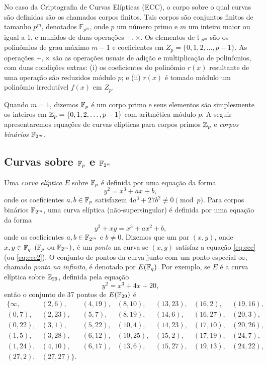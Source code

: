 \documentclass{SBCbookchapter}
\begin{document}
No caso da Criptografia de Curvas Elípticas (ECC), o corpo sobre o qual curvas são definidas são os chamados corpos finitos. Tais corpos são conjuntos finitos de tamanho $p^m$, denotados $\mathbb{F}_{p^m}$, onde $p$ um número primo e $m$ um inteiro maior ou igual a 1, e munidos de duas operações $+, \times$. Os elementos de $\mathbb{F}_{p^m}$ são os polinômios de grau máximo $m-1$ e coeficientes em $Z_p=\{0,1,2,\ldots,p-1\}$. 
As operações $+, \times$ são as operações usuais de adição e multiplicação de polinômios, com duas condições extras: (i) os coeficientes do polinômio $r(x)$ resultante de uma operação são reduzidos módulo $p$; e (ii) $r(x)$ é tomado módulo um polinômio irredutível $f(x)$ em $Z_p$.

Quando $m=1$, dizemos $\mbox{${\mathbb F}$}_p$ é um corpo primo e seus elementos são simplesmente os inteiros em $\mbox{${\mathbb Z}$}_p=\{0,1,2,\ldots,p-1\}$ com aritmética módulo $p$. A seguir  apresentaremos equações de curvas elípticas  para corpos primos $\mbox{${\mathbb Z}$}_p$ e \emph{corpos binários} $\mbox{${\mathbb F}$}_{2^m}$.
%
\subsection*{Curvas sobre $\mbox{${\mathbb F}$}_p$ e $\mbox{${\mathbb F}$}_{2^m}$}
Uma \emph{curva elíptica} $E$ sobre $\mbox{${\mathbb F}$}_p$ é definida por uma equação da forma
\begin{equation}
\label{eq:cce}
y^2 = x^3 + ax + b,
\end{equation}
\noindent onde os coeficientes $a,b  \in \mbox{${\mathbb F}$}_p$ satisfazem $4a^3 + 27b^2
\not\equiv 0 \pmod p$. Para corpos binários $\mbox{${\mathbb F}$}_{2^m}$, uma
curva elíptica (não-supersingular) é definida por uma equação da forma
\begin{equation}
\label{eq:cce2}
y^2 + xy = x^3 + ax^2 + b,
\end{equation}
\noindent onde os  coeficientes $a,b \in \mbox{${\mathbb F}$}_{2^m}$ e  $b\neq 0$.  Dizemos
 que um  par $(x,y)$, onde $x,y \in \mbox{${\mathbb F}$}_q$ $(\mbox{${\mathbb F}$}_p$ ou $\mbox{${\mathbb F}$}_{2^m})$,  é um \emph{
 ponto}  na  curva se  $(x,y)$  satisfaz  a  equação \ref{eq:cce}  (ou
 \ref{eq:cce2}).  O conjunto  de pontos  da curva  junto com  um ponto
 especial {$\infty$}, chamado \emph{ ponto no infinito}, é denotado por
 $E(\mbox{${\mathbb F}$}_q)$.   Por  exemplo,  se $E$  é  a  curva
 elíptica sobre $\mbox{${\mathbb Z}$}_{29}$, definida pela equação
\begin{equation}
\label{eq:cce-exemplo-primo}
y^2 = x^3 + 4x + 20,
\end{equation}
\noindent então o conjunto de 37 pontos de $E(\mbox{${\mathbb F}$}_{29})$ é
\[
\begin{array}{lllllll}
\{{\infty}, & (2,6), & (4,19), & (8,10), & (13,23), & (16,2), & (19,16),  \\
(0,7), & (2,23), & (5,7), & (8,19), & (14,6), & (16,27), & (20,3),  \\
(0,22), & (3,1), & (5,22), & (10,4), & (14,23), & (17,10), & (20,26),  \\
(1,5), & (3,28), & (6,12), & (10,25), & (15,2), & (17,19), & (24,7), \\
(1,24), & (4,10), & (6,17), & (13,6), & (15,27), & (19,13), & (24,22),  \\
(27,2), & (27,27)\}. & & & & & 
\end{array}
\]
\noindent 
\end{document}
